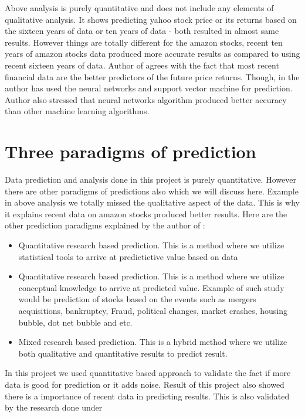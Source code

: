Above analysis is purely quantitative and does not include any elements of qualitative analysis. It shows predicting yahoo stock price or 
its returns based on the sixteen years of data or ten years of data - both resulted in almost same results. However things are totally 
different for the amazon stocks, recent ten years of amazon stocks data produced more accurate results as compared to using recent sixteen years 
of data. Author of \cite{Ref14} agrees with the fact that most recent financial data are the better predictors of the future price returns. Though, 
in the \cite{Ref14} author has used the neural networks and support vector machine for prediction. Author also stressed that neural networks algorithm
produced better accuracy than other machine learning algorithms. 

\section{Three paradigms of prediction}

Data prediction and analysis done in this project is purely quantitative. However there are other paradigms of predictions also which we will discuss here. 
Example in above analysis we totally missed the qualitative aspect of the data. This is why it explains recent data on amazon stocks produced better results. 
Here are the other prediction paradigms explained by the author of \cite{Ref15} : 

\begin{itemize}
\item Quantitative research based prediction. This is a method where we utilize statistical tools to arrive at predictictive value based on data
\item Quantitative research based prediction. This is a method where we utilize conceptual knowledge to arrive at predicted value. Example of such study would be
      prediction of stocks based on the events such as mergers acquisitions, bankruptcy, Fraud, political changes, market crashes, housing bubble, dot net bubble and etc.
\item Mixed research based prediction. This is a hybrid method where we utilize both qualitative and quantitative results to predict result. 
\end{itemize}

In this project we used quantitative based approach to validate the fact if more data is good for prediction or it adds noise. Result of this project also showed
there is a importance of recent data in predicting results. This is also validated by the research done under \cite{Ref14}


